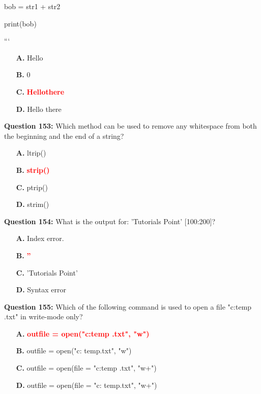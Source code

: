 \documentclass[12pt,a4paper]{article}
\begin{document}
\newline
bob = str1 + str2\newline

\newline
print(bob)\newline

\newline
```

\begin{itemize}
    \item[\textbf{A.}] Hello
    \item[\textbf{B.}] 0
    \item[\textbf{C.}] \textcolor{red}{\textbf{Hellothere}}
    \item[\textbf{D.}] Hello there
\end{itemize}

\vspace{0.5cm}

\textbf{Question 153:} Which method can be used to remove any whitespace from both the beginning and the end of a string?

\begin{itemize}
    \item[\textbf{A.}] ltrip()
    \item[\textbf{B.}] \textcolor{red}{\textbf{strip()}}
    \item[\textbf{C.}] ptrip()
    \item[\textbf{D.}] strim()
\end{itemize}

\vspace{0.5cm}

\textbf{Question 154:} What is the output for: 'Tutorials Point' [100:200]?

\begin{itemize}
    \item[\textbf{A.}] Index error.
    \item[\textbf{B.}] \textcolor{red}{\textbf{''}}
    \item[\textbf{C.}] 'Tutorials Point'
    \item[\textbf{D.}] Syntax error
\end{itemize}

\vspace{0.5cm}

\textbf{Question 155:} Which of the following command is used to open a file "c:temp .txt" in write-mode only?

\begin{itemize}
    \item[\textbf{A.}] \textcolor{red}{\textbf{outfile = open("c:temp .txt", "w")}}
    \item[\textbf{B.}] outfile = open("c: temp.txt", "w")
    \item[\textbf{C.}] outfile = open(file = "c:temp .txt", "w+")
    \item[\textbf{D.}] outfile = open(file = "c: temp.txt", "w+")
\end{itemize}
\end{document}
